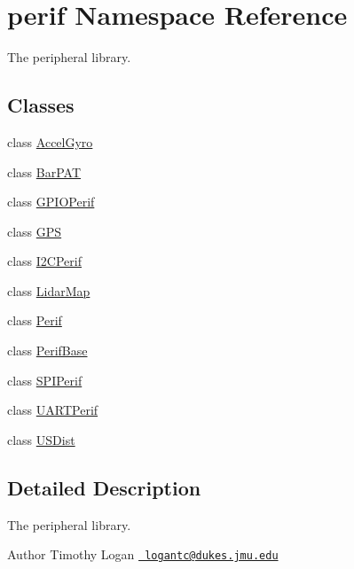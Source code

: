 \hypertarget{namespaceperif}{}\section{perif Namespace Reference}
\label{namespaceperif}


The peripheral library.  


\subsection*{Classes}
\begin{DoxyCompactItemize}
\item 
class \mbox{\hyperlink{classperif_1_1AccelGyro}{Accel\+Gyro}}
\item 
class \mbox{\hyperlink{classperif_1_1BarPAT}{Bar\+P\+AT}}
\item 
class \mbox{\hyperlink{classperif_1_1GPIOPerif}{G\+P\+I\+O\+Perif}}
\item 
class \mbox{\hyperlink{classperif_1_1GPS}{G\+PS}}
\item 
class \mbox{\hyperlink{classperif_1_1I2CPerif}{I2\+C\+Perif}}
\item 
class \mbox{\hyperlink{classperif_1_1LidarMap}{Lidar\+Map}}
\item 
class \mbox{\hyperlink{classperif_1_1Perif}{Perif}}
\item 
class \mbox{\hyperlink{classperif_1_1PerifBase}{Perif\+Base}}
\item 
class \mbox{\hyperlink{classperif_1_1SPIPerif}{S\+P\+I\+Perif}}
\item 
class \mbox{\hyperlink{classperif_1_1UARTPerif}{U\+A\+R\+T\+Perif}}
\item 
class \mbox{\hyperlink{classperif_1_1USDist}{U\+S\+Dist}}
\end{DoxyCompactItemize}


\subsection{Detailed Description}
The peripheral library. 

\begin{DoxyAuthor}{Author}
Timothy Logan \href{mailto:logantc@dukes.jmu.edu}{\texttt{ logantc@dukes.\+jmu.\+edu}} 
\end{DoxyAuthor}
